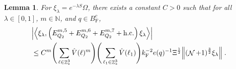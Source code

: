 \documentclass[12pt,a4paper]{article}
\numberwithin{equation}{section}
\newcommand{\NNN}{\mathbb{N}}
\newcommand{\1}{\mathbb{I}}
\newcommand{\F}{\mathrm{F}}
\DeclareMathOperator{\Z}{\mathbb{Z}}
\DeclareMathOperator{\NN}{\mathcal{N}}
\newcommand{\half}{\frac{1}{2}}
\newcommand{\eva}[1]{\left\langle #1 \right\rangle}
\theoremstyle{plain}
\newtheorem{lemma}[theorem]{Lemma}
\theoremstyle{definition}
\theoremstyle{remark}
\theoremstyle{plain}
\theoremstyle{definition}
\theoremstyle{remark}
\begin{document}
\begin{lemma} \label{lem:EQ213}
For $\xi_\lambda = e^{-\lambda S} \Omega$, there exists a constant $ C > 0 $ such that for all $ \lambda \in [0,1] $, $ m \in \NNN $, and $ q \in B_{\F}^c $,
\begin{equation}
\begin{aligned}
	&\abs{\eva{\xi_\lambda,\left(E^{m,5}_{Q_2}+E^{m,6}_{Q_2}+E^{m,7}_{Q_2}+\mathrm{h.c.}\right) \xi_\lambda }} \\
	&\leq C^m \Bigg(\sum_{\ell \in \Z^3_*} \hat{V}(\ell)^m \Bigg)
		\Bigg( \sum_{\ell_1 \in \Z^3_*}\hat{V}(\ell_1) \Bigg)
		k_{\F}^{-2} e(q)^{-1} \Xi^{\half}
		\norm { (\NN+1)^{\frac 32} \xi_\lambda } \;. \label{eq:estEQ213}
\end{aligned}
\end{equation}
\end{lemma}
\end{document}

